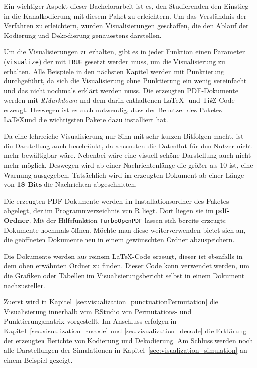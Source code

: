 Ein wichtiger Aspekt dieser Bachelorarbeit ist es, den Studierenden den Einstieg in die Kanalkodierung mit diesem Paket zu erleichtern. Um das Verständnis der Verfahren zu erleichtern, wurden Visualisierungen geschaffen, die den Ablauf der Kodierung und Dekodierung genauestens darstellen.

Um die Visualisierungen zu erhalten, gibt es in jeder Funktion einen Parameter (\texttt{visualize}) der mit \texttt{TRUE} gesetzt werden muss, um die Visualisierung zu erhalten. Alle Beispiele in den nächsten Kapitel werden mit Punktierung durchgeführt, da sich die Visualisierung ohne Punktierung ein wenig vereinfacht und das nicht nochmals erklärt werden muss. Die erzeugten PDF-Dokumente werden mit \emph{RMarkdown} und dem darin enthaltenen \LaTeX - und Ti\textit{k}Z-Code erzeugt. Deswegen ist es auch notwendig, dass der Benutzer des Paketes \LaTeX und die wichtigsten Pakete dazu installiert hat.

Da eine lehrreiche Visualisierung nur Sinn mit sehr kurzen Bitfolgen macht, ist die Darstellung auch beschränkt, da ansonsten die Datenflut für den Nutzer nicht mehr bewältigbar wäre. Nebenbei wäre eine visuell schöne Darstellung auch nicht mehr möglich. Deswegen wird ab einer Nachrichtenlänge die größer als 10 ist, eine Warnung ausgegeben. Tatsächlich wird im erzeugten Dokument ab einer Länge von \textbf{18 Bits} die Nachrichten abgeschnitten.

Die erzeugten PDF-Dokumente werden im Installationsordner des Paketes abgelegt, der im Programmverzeichnis von R liegt. Dort liegen sie im \textbf{pdf-Ordner}. Mit der Hilfsfunktion \texttt{TurboOpenPDF} lassen sich bereits erzeugte Dokumente nochmals öffnen. Möchte man diese weiterverwenden bietet sich an, die geöffneten Dokumente neu in einem gewünschten Ordner abzuspeichern.

Die Dokumente werden aus reinem \LaTeX -Code erzeugt, dieser ist ebenfalls in dem oben erwähnten Ordner zu finden. Dieser Code kann verwendet werden, um die Grafiken oder Tabellen im Visualisierungsbericht selbst in einem Dokument nachzustellen.

Zuerst wird in Kapitel~\ref{sec:visualization_punctuationPermutation} die Visualisierung innerhalb vom RStudio von Permutations- und Punktierungsmatrix vorgestellt. Im Anschluss erfolgen in Kapitel~\ref{sec:visualization_encode} und \ref{sec:visualization_decode} die Erklärung der erzeugten Berichte von Kodierung und Dekodierung. Am Schluss werden noch alle Darstellungen der Simulationen in Kapitel~\ref{sec:visualization_simulation} an einem Beispiel gezeigt. 
